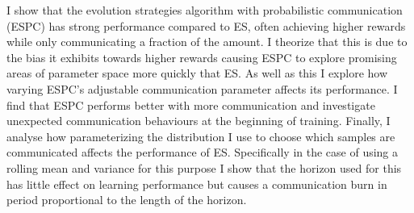 I show that the evolution strategies algorithm with probabilistic communication (ESPC) has strong performance compared to ES, often achieving higher rewards while only communicating a fraction of the amount. I theorize that this is due to the bias it exhibits towards higher rewards causing ESPC to explore promising areas of parameter space more quickly that ES.
As well as this I explore how varying ESPC's adjustable communication parameter affects its performance. I find that ESPC performs better with more communication and investigate unexpected communication behaviours at the beginning of training. Finally, I analyse how parameterizing the distribution I use to choose which samples are communicated affects the performance of ES. Specifically in the case of using a rolling mean and variance for this purpose I show that the horizon used for this has little effect on learning performance but causes a communication burn in period proportional to the length of the horizon.
